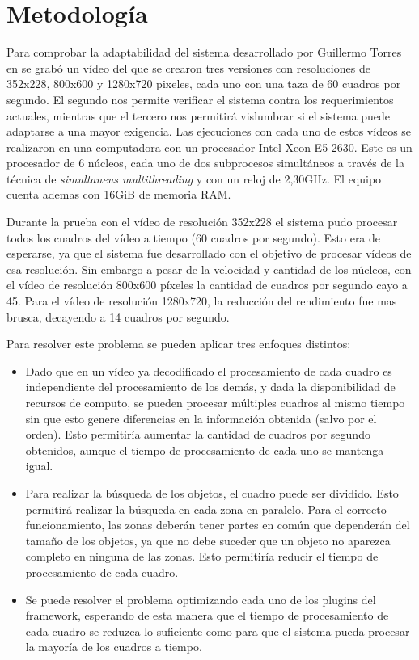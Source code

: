 
\section{Metodología}

Para comprobar la adaptabilidad del sistema desarrollado por Guillermo Torres en
\cite{torres2014} se grabó un vídeo del que se crearon tres versiones con
resoluciones de 352x228, 800x600 y 1280x720 pixeles, cada uno con una taza de 60
cuadros por segundo. El segundo nos permite verificar el sistema contra los
requerimientos actuales, mientras que el tercero nos permitirá vislumbrar si el
sistema puede adaptarse a una mayor exigencia. Las ejecuciones con cada uno de
estos vídeos se realizaron en una computadora con un procesador Intel Xeon
E5-2630. Este es un procesador de 6 núcleos, cada uno de dos subprocesos
simultáneos a través de la técnica de \emph{simultaneus multithreading} y con un
reloj de 2,30GHz. El equipo cuenta ademas con 16GiB de memoria RAM.

Durante la prueba con el vídeo de resolución 352x228 el sistema pudo procesar
todos los cuadros del vídeo a tiempo (60 cuadros por segundo). Esto era de
esperarse, ya que el sistema fue desarrollado con el objetivo de procesar vídeos
de esa resolución. Sin embargo a pesar de la velocidad y cantidad de los
núcleos, con el vídeo de resolución 800x600 píxeles la cantidad de cuadros por
segundo cayo a 45. Para el vídeo de resolución 1280x720, la reducción del
rendimiento fue mas brusca, decayendo a 14 cuadros por segundo.

Para resolver este problema se pueden aplicar tres enfoques distintos:

\begin{itemize}

\item 	Dado que en un vídeo ya decodificado el procesamiento de cada cuadro es
	independiente del procesamiento de los demás, y dada la disponibilidad
	de recursos de computo, se pueden procesar múltiples cuadros al mismo
	tiempo sin que esto genere diferencias en la información obtenida (salvo
	por el orden). Esto permitiría aumentar la cantidad de cuadros por
	segundo obtenidos, aunque el tiempo de procesamiento de cada uno se
	mantenga igual.

\item	Para realizar la búsqueda de los objetos, el cuadro puede ser dividido.
	Esto permitirá realizar la búsqueda en cada zona en paralelo. Para el
	correcto funcionamiento, las zonas deberán tener partes en común que
	dependerán del tamaño de los objetos, ya que no debe suceder que un
	objeto no aparezca completo en ninguna de las zonas. Esto permitiría
	reducir el tiempo de procesamiento de cada cuadro.

\item	Se puede resolver el problema optimizando cada uno de los plugins del
	framework, esperando de esta manera que el tiempo de procesamiento de
	cada cuadro se reduzca lo suficiente como para que el sistema pueda
	procesar la mayoría de los cuadros a tiempo.

\end{itemize}

